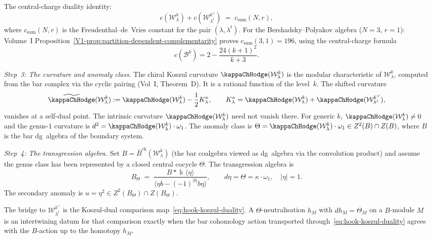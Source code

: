 \begin{construction}
The central-charge duality identity:
\begin{equation}\label{eq:hook-cc-sum}
c(\mathcal W_\lambda^k)
+c(\mathcal W_{\lambda^t}^{k^\vee})
\;=\;
c_{\mathrm{sum}}(N,r),
\end{equation}
where $c_{\mathrm{sum}}(N,r)$ is the Freudenthal--de~Vries
constant for the pair $(\lambda,\lambda^t)$. For the
Bershadsky--Polyakov algebra ($N=3$, $r=1$):
Volume~I Proposition~\ref*{V1-prop:partition-dependent-complementarity}
proves $c_{\mathrm{sum}}(3,1) = 196$, using the central-charge
formula
\[
c(\mathcal{B}^k)=2-\frac{24(k+1)^2}{k+3}.
\]

\emph{Step~3: The curvature and anomaly class.}
The chiral Koszul curvature $\kappaChHodge(\mathcal W_\lambda^k)$ is
the modular characteristic of $\mathcal W_\lambda^k$,
computed from the bar complex via the cyclic pairing
(Vol~I, Theorem~D). It is a rational function of the
level~$k$.  The shifted curvature
\[
\widetilde\kappaChHodge(\mathcal W_\lambda^k)
:=\kappaChHodge(\mathcal W_\lambda^k)-\frac{1}{2}K^\kappa_\lambda,
\qquad
K^\kappa_\lambda=
\kappaChHodge(\mathcal W_\lambda^k)+
\kappaChHodge(\mathcal W_{\lambda^t}^{k^\vee}),
\]
vanishes at a self-dual point.  The intrinsic curvature
\(\kappaChHodge(\mathcal W_\lambda^k)\) need not vanish there.  For generic
$k$,
$\kappaChHodge(\mathcal W_\lambda^k)\neq 0$ and the genus-$1$ curvature is
$d^2=\kappaChHodge(\mathcal W_\lambda^k)\cdot\omega_1$. The anomaly class is
$\Theta=\kappaChHodge(\mathcal W_\lambda^k)\cdot\omega_1\in Z^2(B)\cap Z(B)$, where $B$
is the bar dg~algebra of the boundary system.

\emph{Step~4: The transgression algebra.}
Set $B=\bar B^{\mathrm{ch}}(\mathcal W_\lambda^k)$
(the bar coalgebra viewed as dg~algebra via the convolution
product) and assume the genus class has been represented by a closed
central cocycle \(\Theta\). The transgression algebra is
\[
B_\Theta
\;=\;
\frac{B*\Bbbk\langle\eta\rangle}
{\langle\eta b-(-1)^{|b|}b\eta\rangle},
\qquad
d\eta=\Theta=\kappa\cdot\omega_1,
\quad|\eta|=1.
\]
The secondary anomaly is
$u=\eta^2\in Z^2(B_\Theta)\cap Z(B_\Theta)$.

The bridge to \(\mathcal W_{\lambda^t}^{k^\vee}\) is the Koszul-dual
comparison map~\eqref{eq:hook-koszul-duality}. A
\(\Theta\)-neutralisation \(h_M\) with \(dh_M=\Theta_M\) on a
\(B\)-module \(M\) is an intertwining datum for that comparison
exactly when the bar cohomology action transported
through~\eqref{eq:hook-koszul-duality} agrees with the \(B\)-action
up to the homotopy \(h_M\).


\end{construction}
